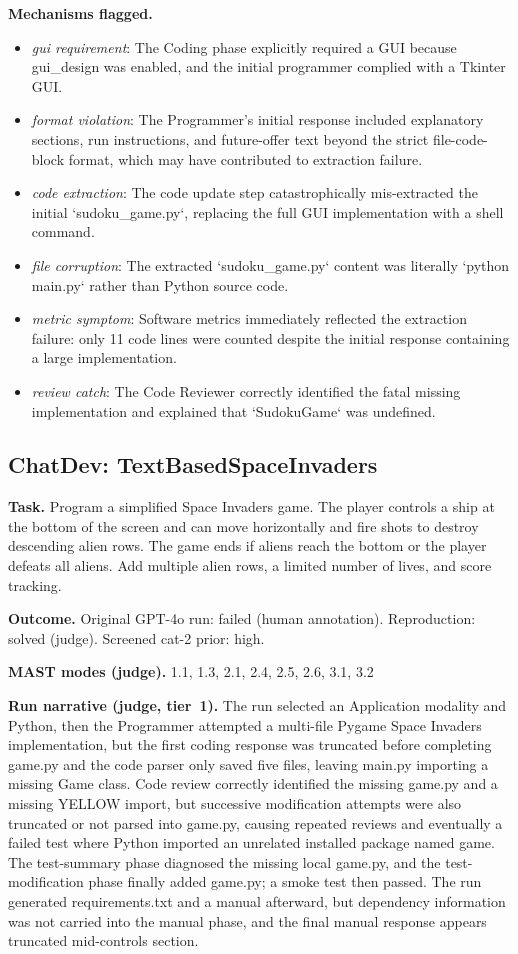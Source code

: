 \textbf{Mechanisms flagged.}
\begin{itemize}
  \item \emph{gui requirement}: The Coding phase explicitly required a GUI because gui\_design was enabled, and the initial programmer complied with a Tkinter GUI.
  \item \emph{format violation}: The Programmer's initial response included explanatory sections, run instructions, and future-offer text beyond the strict file-code-block format, which may have contributed to extraction failure.
  \item \emph{code extraction}: The code update step catastrophically mis-extracted the initial `sudoku\_game.py`, replacing the full GUI implementation with a shell command.
  \item \emph{file corruption}: The extracted `sudoku\_game.py` content was literally `python main.py` rather than Python source code.
  \item \emph{metric symptom}: Software metrics immediately reflected the extraction failure: only 11 code lines were counted despite the initial response containing a large implementation.
  \item \emph{review catch}: The Code Reviewer correctly identified the fatal missing implementation and explained that `SudokuGame` was undefined.
\end{itemize}

\subsection*{ChatDev: TextBasedSpaceInvaders}
\textbf{Task.} Program a simplified Space Invaders game. The player controls a ship at the bottom of the screen and can move horizontally and fire shots to destroy descending alien rows. The game ends if aliens reach the bottom or the player defeats all aliens. Add multiple alien rows, a limited number of lives, and score tracking.

\textbf{Outcome.} Original GPT-4o run: failed (human annotation). Reproduction: solved (judge). Screened cat-2 prior: high.

\textbf{MAST modes (judge).} 1.1, 1.3, 2.1, 2.4, 2.5, 2.6, 3.1, 3.2

\textbf{Run narrative (judge, tier~1).} The run selected an Application modality and Python, then the Programmer attempted a multi-file Pygame Space Invaders implementation, but the first coding response was truncated before completing game.py and the code parser only saved five files, leaving main.py importing a missing Game class. Code review correctly identified the missing game.py and a missing YELLOW import, but successive modification attempts were also truncated or not parsed into game.py, causing repeated reviews and eventually a failed test where Python imported an unrelated installed package named game. The test-summary phase diagnosed the missing local game.py, and the test-modification phase finally added game.py; a smoke test then passed. The run generated requirements.txt and a manual afterward, but dependency information was not carried into the manual phase, and the final manual response appears truncated mid-controls section.

